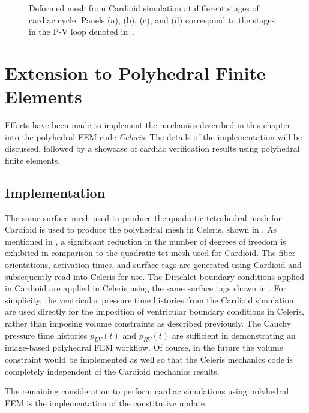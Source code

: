 \begin{figure}
{\label{fig:snaps4}}		
%
\caption{Deformed mesh from Cardioid simulation at different stages of cardiac cycle. Panels (a), (b), (c), and (d) correspond to the stages in the P-V loop denoted in~.}
\label{fig:snaps}
\end{figure}

\section{Extension to Polyhedral Finite Elements}
\label{Polyhedral Finite Elements}

Efforts have been made to implement the mechanics described in this chapter into the polyhedral FEM code \textit{Celeris}. The details of the implementation will be discussed, followed by a showcase of cardiac verification results using polyhedral finite elements.

\subsection{Implementation}

The same surface mesh used to produce the quadratic tetrahedral mesh for Cardioid is used to produce the polyhedral mesh in Celeris, shown in . As mentioned in , a significant reduction in the number of degrees of freedom is exhibited in comparison to the quadratic tet mesh used for Cardioid. The fiber orientations, activation times, and surface tags are generated using Cardioid and subsequently read into Celeris for use. The Dirichlet boundary conditions applied in Cardioid are applied in Celeris using the same surface tags shown in . For simplicity, the ventricular pressure time histories from the Cardioid simulation are used directly for the imposition of ventricular boundary conditions in Celeris, rather than imposing volume constraints as described previously. The Cauchy pressure time histories $p_{LV}(t)$ and $p_{RV}(t)$ are sufficient in demonstrating an image-based polyhedral FEM workflow. Of course, in the future the volume constraint would be implemented as well so that the Celeris mechanics code is completely independent of the Cardioid mechanics results. 

The remaining consideration to perform cardiac simulations using polyhedral FEM is the implementation of the constitutive update.

